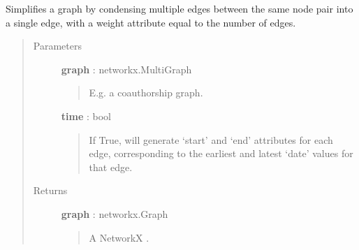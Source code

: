 \documentclass[letterpaper,10pt,english]{sphinxmanual}
\begin{document}
\begin{fulllineitems}
\label{tethne.networks:tethne.networks.helpers.simplify_multigraph}
Simplifies a graph by condensing multiple edges between the same node pair
into a single edge, with a weight attribute equal to the number of edges.
\begin{quote}\begin{description}
\item[{Parameters }] \leavevmode
\textbf{graph} : networkx.MultiGraph
\begin{quote}

E.g. a coauthorship graph.
\end{quote}

\textbf{time} : bool
\begin{quote}

If True, will generate `start' and `end' attributes for each edge,
corresponding to the earliest and latest `date' values for that edge.
\end{quote}

\item[{Returns }] \leavevmode
\textbf{graph} : networkx.Graph
\begin{quote}

A NetworkX  .
\end{quote}

\end{description}\end{quote}

\end{fulllineitems}

\end{document}
